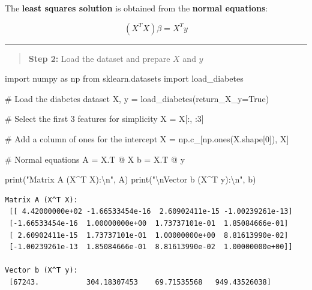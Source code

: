 \documentclass[
  letterpaper,
  DIV=11,
  numbers=noendperiod]{scrreprt}
\newenvironment{Shaded}{\begin{snugshade}}{\end{snugshade}}
\newcommand{\BuiltInTok}[1]{\textcolor[rgb]{0.00,0.23,0.31}{#1}}
\newcommand{\CharTok}[1]{\textcolor[rgb]{0.13,0.47,0.30}{#1}}
\newcommand{\CommentTok}[1]{\textcolor[rgb]{0.37,0.37,0.37}{#1}}
\newcommand{\DecValTok}[1]{\textcolor[rgb]{0.68,0.00,0.00}{#1}}
\newcommand{\ImportTok}[1]{\textcolor[rgb]{0.00,0.46,0.62}{#1}}
\newcommand{\NormalTok}[1]{\textcolor[rgb]{0.00,0.23,0.31}{#1}}
\newcommand{\OperatorTok}[1]{\textcolor[rgb]{0.37,0.37,0.37}{#1}}
\newcommand{\StringTok}[1]{\textcolor[rgb]{0.13,0.47,0.30}{#1}}
\newcommand{\VariableTok}[1]{\textcolor[rgb]{0.07,0.07,0.07}{#1}}
\begin{document}
The \textbf{least squares solution} is obtained from the \textbf{normal
equations}:

\[
(X^T X) \beta = X^T y
\]

\begin{center}\rule{0.5\linewidth}{0.5pt}\end{center}

\begin{quote}
\textbf{Step 2:} Load the dataset and prepare \(X\) and \(y\)
\end{quote}

\begin{Shaded}
\begin{Highlighting}[]
\ImportTok{import}\NormalTok{ numpy }\ImportTok{as}\NormalTok{ np}
\ImportTok{from}\NormalTok{ sklearn.datasets }\ImportTok{import}\NormalTok{ load\_diabetes}

\CommentTok{\# Load the diabetes dataset}
\NormalTok{X, y }\OperatorTok{=}\NormalTok{ load\_diabetes(return\_X\_y}\OperatorTok{=}\VariableTok{True}\NormalTok{)}

\CommentTok{\# Select the first 3 features for simplicity}
\NormalTok{X }\OperatorTok{=}\NormalTok{ X[:, :}\DecValTok{3}\NormalTok{]}

\CommentTok{\# Add a column of ones for the intercept}
\NormalTok{X }\OperatorTok{=}\NormalTok{ np.c\_[np.ones(X.shape[}\DecValTok{0}\NormalTok{]), X]}

\CommentTok{\# Normal equations}
\NormalTok{A }\OperatorTok{=}\NormalTok{ X.T }\OperatorTok{@}\NormalTok{ X}
\NormalTok{b }\OperatorTok{=}\NormalTok{ X.T }\OperatorTok{@}\NormalTok{ y}

\BuiltInTok{print}\NormalTok{(}\StringTok{"Matrix A (X\^{}T X):}\CharTok{\textbackslash{}n}\StringTok{"}\NormalTok{, A)}
\BuiltInTok{print}\NormalTok{(}\StringTok{"}\CharTok{\textbackslash{}n}\StringTok{Vector b (X\^{}T y):}\CharTok{\textbackslash{}n}\StringTok{"}\NormalTok{, b)}
\end{Highlighting}
\end{Shaded}

\begin{verbatim}
Matrix A (X^T X):
 [[ 4.42000000e+02 -1.66533454e-16  2.60902411e-15 -1.00239261e-13]
 [-1.66533454e-16  1.00000000e+00  1.73737101e-01  1.85084666e-01]
 [ 2.60902411e-15  1.73737101e-01  1.00000000e+00  8.81613990e-02]
 [-1.00239261e-13  1.85084666e-01  8.81613990e-02  1.00000000e+00]]

Vector b (X^T y):
 [67243.           304.18307453    69.71535568   949.43526038]
\end{verbatim}
\end{document}
